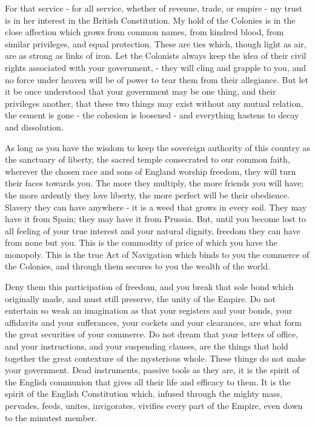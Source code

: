 For that service - for all service, whether of revenue, trade, or empire - my trust is in her interest in the British Constitution. My hold of the Colonies is in the close affection which grows from common names, from kindred blood, from similar privileges, and equal protection. These are ties which, though light as air, are as strong as links of iron. Let the Colonists always keep the idea of their civil rights associated with your government, - they will cling and grapple to you, and no force under heaven will be of power to tear them from their allegiance. But let it be once understood that your government may be one thing, and their privileges another, that these two things may exist without any mutual relation, the cement is gone - the cohesion is loosened - and everything hastens to decay and dissolution.\par

As long as you have the wisdom to keep the sovereign authority of this country as the sanctuary of liberty, the sacred temple consecrated to our common faith, wherever the chosen race and sons of England worship freedom, they will turn their faces towards you. The more they multiply, the more friends you will have; the more ardently they love liberty, the more perfect will be their obedience. Slavery they can have anywhere - it is a weed that grows in every soil. They may have it from Spain; they may have it from Prussia. But, until you become lost to all feeling of your true interest and your natural dignity, freedom they can have from none but you. This is the commodity of price of which you have the monopoly. This is the true Act of Navigation which binds to you the commerce of the Colonies, and through them secures to you the wealth of the world.\par

Deny them this participation of freedom, and you break that sole bond which originally made, and must still preserve, the unity of the Empire. Do not entertain so weak an imagination as that your registers and your bonds, your affidavits and your sufferances, your cockets and your clearances, are what form the great securities of your commerce. Do not dream that your letters of office, and your instructions, and your suspending clauses, are the things that hold together the great contexture of the mysterious whole. These things do not make your government. Dead instruments, passive tools as they are, it is the spirit of the English communion that gives all their life and efficacy to them. It is the spirit of the English Constitution which, infused through the mighty mass, pervades, feeds, unites, invigorates, vivifies every part of the Empire, even down to the minutest member.\par

